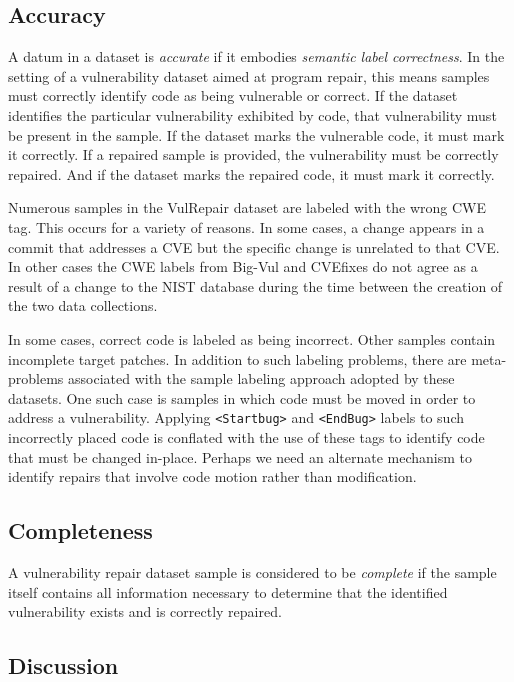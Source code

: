 \subsection{Accuracy}

A datum in a dataset is \emph{accurate} if it embodies \emph{semantic label correctness}.
In the setting of a vulnerability dataset aimed at program repair, this means samples must correctly identify code as being vulnerable or correct.
If the dataset identifies the particular vulnerability exhibited by code, that vulnerability must be present in the sample.
If the dataset marks the vulnerable code, it must mark it correctly.
If a repaired sample is provided, the vulnerability must be correctly repaired.
And if the dataset marks the repaired code, it must mark it correctly.

Numerous samples in the VulRepair dataset are labeled with the wrong CWE tag.
This occurs for a variety of reasons.
In some cases, a change appears in a commit that addresses a CVE but the specific change is unrelated to that CVE.
In other cases the CWE labels from Big-Vul and CVEfixes do not agree as a result of a change to the NIST database during the time between the creation of the two data collections.

In some cases, correct code is labeled as being incorrect.
Other samples contain incomplete target patches.
In addition to such labeling problems, there are meta-problems associated with the sample labeling approach adopted by these datasets.
One such case is samples in which code must be moved in order to address a vulnerability.
Applying \texttt{<Startbug>} and \texttt{<EndBug>} labels to such incorrectly placed code is conflated with the use of these tags to identify code that must be changed in-place.
Perhaps we need an alternate mechanism to identify repairs that involve code motion rather than modification.




\subsection{Completeness}
A vulnerability repair dataset sample is considered to be \emph{complete} if the sample itself contains all information necessary to determine that the identified vulnerability exists and is correctly repaired.

\subsection{Discussion}
\label{Dataset:Discussion}

